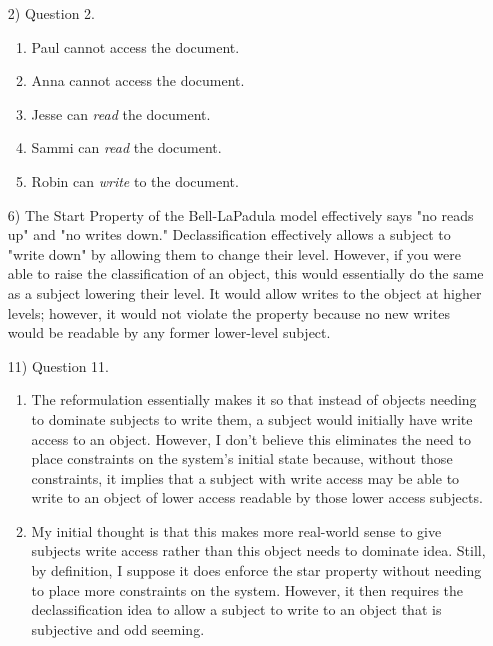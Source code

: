 \documentclass[journal,onecolumn]{IEEEtran}
\begin{document}
\begin{enumerate}
  \item [2)] Question 2.
  \begin{enumerate}
    \item Paul cannot access the document.
    \item Anna cannot access the document.
    \item Jesse can \textit{read} the document.
    \item Sammi can \textit{read} the document.
    \item Robin can \textit{write} to the document.
  \end{enumerate}
  \item [6)] The Start Property of the Bell-LaPadula model effectively says "no reads up" and "no writes down." Declassification effectively allows a subject to "write down" by allowing them to change their level. However, if you were able to raise the classification of an object, this would essentially do the same as a subject lowering their level. It would allow writes to the object at higher levels; however, it would not violate the property because no new writes would be readable by any former lower-level subject. 
  \item [11)] Question 11.
  \begin{enumerate}
    \item The reformulation essentially makes it so that instead of objects needing to dominate subjects to write them, a subject would initially have write access to an object. However, I don't believe this eliminates the need to place constraints on the system's initial state because, without those constraints, it implies that a subject with write access may be able to write to an object of lower access readable by those lower access subjects. 
    \item My initial thought is that this makes more real-world sense to give subjects write access rather than this object needs to dominate idea. Still, by definition, I suppose it does enforce the star property without needing to place more constraints on the system. However, it then requires the declassification idea to allow a subject to write to an object that is subjective and odd seeming. 
  \end{enumerate}
\end{enumerate}

\end{document}
